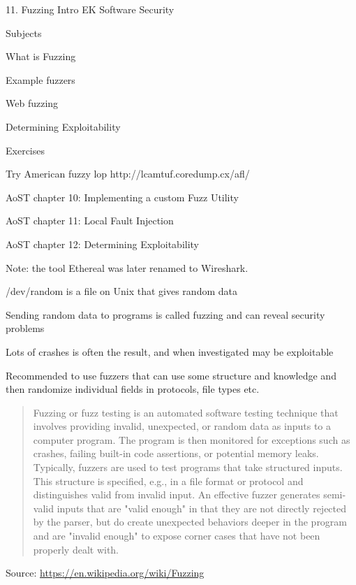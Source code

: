 \documentclass[Screen16to9,17pt]{foils}
\begin{document}
\mytitlepage
{11. Fuzzing Intro}
{EK  Software Security}


\begin{list1}
\item Subjects
\begin{list2}
\item What is Fuzzing
\item Example fuzzers
\item Web fuzzing
\item Determining Exploitability
\end{list2}
\item Exercises
\begin{list2}
\item Try American fuzzy lop http://lcamtuf.coredump.cx/afl/
\end{list2}
\end{list1}


\begin{list1}
\item AoST chapter 10: Implementing a custom Fuzz Utility
\item AoST chapter 11: Local Fault Injection
\item AoST chapter 12: Determining Exploitability
\end{list1}

Note: the tool Ethereal was later renamed to Wireshark.



\begin{list1}
\item /dev/random is a file on Unix that gives random data
\item Sending random data to programs is called fuzzing and can reveal security problems
\item Lots of crashes is often the result, and when investigated may be exploitable
\item Recommended to use fuzzers that can use some structure and knowledge and then randomize individual fields in protocols, file types etc.
\end{list1}


\begin{quote}
  Fuzzing or fuzz testing is an automated software testing technique that involves providing invalid, unexpected, or random data as inputs to a computer program. The program is then monitored for exceptions such as crashes, failing built-in code assertions, or potential memory leaks. Typically, fuzzers are used to test programs that take structured inputs. This structure is specified, e.g., in a file format or protocol and distinguishes valid from invalid input. An effective fuzzer generates semi-valid inputs that are "valid enough" in that they are not directly rejected by the parser, but do create unexpected behaviors deeper in the program and are "invalid enough" to expose corner cases that have not been properly dealt with.
\end{quote}
Source: \url{https://en.wikipedia.org/wiki/Fuzzing}
\end{document}
